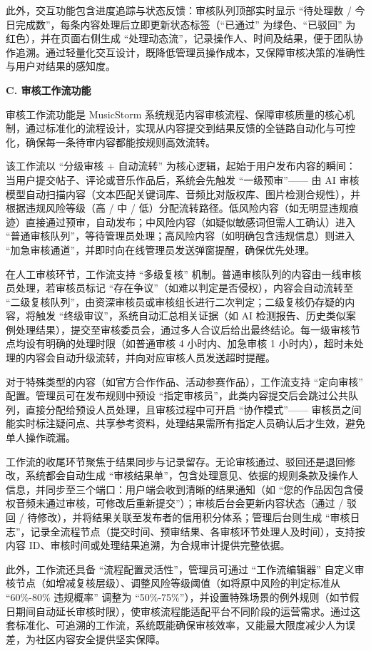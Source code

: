 \documentclass{base}
\numberwithin{figure}{section} %
\begin{document}
此外，交互功能包含进度追踪与状态反馈：审核队列顶部实时显示 “待处理数 / 今日完成数”，每条内容处理后立即更新状态标签（“已通过” 为绿色、“已驳回” 为红色），并在页面右侧生成 “处理动态流”，记录操作人、时间及结果，便于团队协作追溯。通过轻量化交互设计，既降低管理员操作成本，又保障审核决策的准确性与用户对结果的感知度。

\textbf{C. 审核工作流功能}

审核工作流功能是 MusicStorm 系统规范内容审核流程、保障审核质量的核心机制，通过标准化的流程设计，实现从内容提交到结果反馈的全链路自动化与可控化，确保每一条待审内容都能按规则高效流转。​

该工作流以 “分级审核 + 自动流转” 为核心逻辑，起始于用户发布内容的瞬间：当用户提交帖子、评论或音乐作品后，系统会先触发 “一级预审”—— 由 AI 审核模型自动扫描内容（文本匹配关键词库、音频比对版权库、图片检测合规性），并根据违规风险等级（高 / 中 / 低）分配流转路径。低风险内容（如无明显违规痕迹）直接通过预审，自动发布；中风险内容（如疑似敏感词但需人工确认）进入 “普通审核队列”，等待管理员处理；高风险内容（如明确包含违规信息）则进入 “加急审核通道”，并即时向在线管理员发送弹窗提醒，确保优先处理。​

在人工审核环节，工作流支持 “多级复核” 机制。普通审核队列的内容由一线审核员处理，若审核员标记 “存在争议”（如难以判定是否侵权），内容会自动流转至 “二级复核队列”，由资深审核员或审核组长进行二次判定；二级复核仍存疑的内容，将触发 “终级审议”，系统自动汇总相关证据（如 AI 检测报告、历史类似案例处理结果），提交至审核委员会，通过多人合议后给出最终结论。每一级审核节点均设有明确的处理时限（如普通审核 4 小时内、加急审核 1 小时内），超时未处理的内容会自动升级流转，并向对应审核人员发送超时提醒。​

对于特殊类型的内容（如官方合作作品、活动参赛作品），工作流支持 “定向审核” 配置。管理员可在发布规则中预设 “指定审核员”，此类内容提交后会跳过公共队列，直接分配给预设人员处理，且审核过程中可开启 “协作模式”—— 审核员之间能实时标注疑问点、共享参考资料，处理结果需所有指定人员确认后才生效，避免单人操作疏漏。​

工作流的收尾环节聚焦于结果同步与记录留存。无论审核通过、驳回还是退回修改，系统都会自动生成 “审核结果单”，包含处理意见、依据的规则条款及操作人信息，并同步至三个端口：用户端会收到清晰的结果通知（如 “您的作品因包含侵权音频未通过审核，可修改后重新提交”）；审核后台会更新内容状态（通过 / 驳回 / 待修改），并将结果关联至发布者的信用积分体系；管理后台则生成 “审核日志”，记录全流程节点（提交时间、预审结果、各审核环节处理人及时间），支持按内容 ID、审核时间或处理结果追溯，为合规审计提供完整依据。

此外，工作流还具备 “流程配置灵活性”，管理员可通过 “工作流编辑器” 自定义审核节点（如增减复核层级）、调整风险等级阈值（如将原中风险的判定标准从 “60\%-80\% 违规概率” 调整为 “50\%-75\%”），并设置特殊场景的例外规则（如节假日期间自动延长审核时限），使审核流程能适配平台不同阶段的运营需求。通过这套标准化、可追溯的工作流，系统既能确保审核效率，又能最大限度减少人为误差，为社区内容安全提供坚实保障。​
\end{document}
